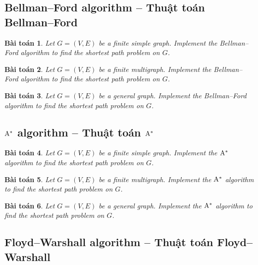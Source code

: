 \documentclass{article}
\newtheorem{baitoan}{Bài toán}
\begin{document}

\subsection{Bellman--Ford algorithm -- Thuật toán Bellman--Ford}

\begin{baitoan}
    Let $G = (V,E)$ be a finite simple graph. Implement the Bellman--Ford algorithm to find the shortest path problem on $G$.
\end{baitoan}

\begin{baitoan}
    Let $G = (V,E)$ be a finite multigraph. Implement the Bellman--Ford algorithm to find the shortest path problem on $G$.
\end{baitoan}

\begin{baitoan}
    Let $G = (V,E)$ be a general graph. Implement the Bellman--Ford algorithm to find the shortest path problem on $G$.
\end{baitoan}


\subsection{$\rm A^*$ algorithm -- Thuật toán $\rm A^*$}

\begin{baitoan}
    Let $G = (V,E)$ be a finite simple graph. Implement the $\rm A^*$ algorithm to find the shortest path problem on $G$.
\end{baitoan}

\begin{baitoan}
    Let $G = (V,E)$ be a finite multigraph. Implement the $\rm A^*$ algorithm to find the shortest path problem on $G$.
\end{baitoan}

\begin{baitoan}
    Let $G = (V,E)$ be a general graph. Implement the $\rm A^*$ algorithm to find the shortest path problem on $G$.
\end{baitoan}


\subsection{Floyd--Warshall algorithm -- Thuật toán Floyd--Warshall}
\end{document}
